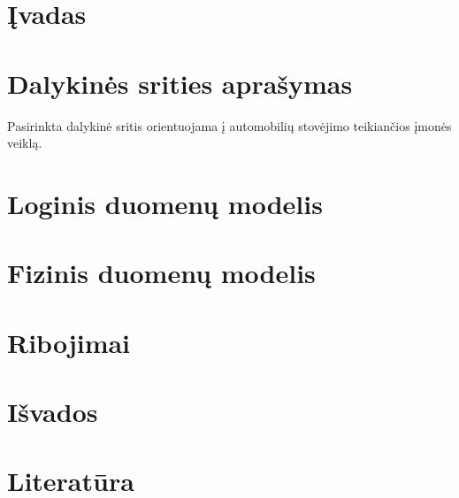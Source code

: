 \documentclass{IEEEtran}
\author{Maksim Norkin}
\date{\today}
\begin{document}
	\maketitle

	\section{Įvadas}

	\section{Dalykinės srities aprašymas}

		Pasirinkta dalykinė sritis orientuojama į automobilių stovėjimo teikiančios įmonės veiklą. 		

	\section{Loginis duomenų modelis}

	\section{Fizinis duomenų modelis}

	\section{Ribojimai}

	\section{Išvados}

	\section{Literatūra}
\end{document}
